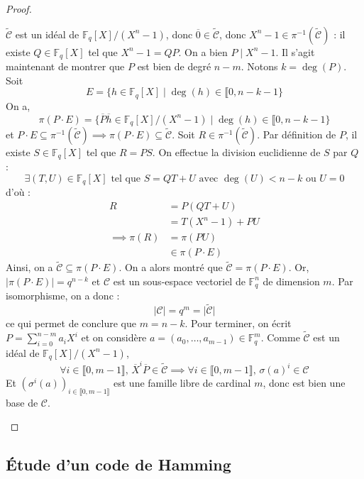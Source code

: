 \begin{proof}
\begin{enumerate}[label={\bfseries(\roman*)}]
      \newpar
      $\widetilde{\mathcal{C}}$ est un idéal de $\mathbb{F}_q[X]/(X^n-1)$, donc $\overline{0} \in \widetilde{\mathcal{C}}$, donc $X^n - 1 \in \pi^{-1}(\widetilde{\mathcal{C}})$ : il existe $Q \in \mathbb{F}_q[X]$ tel que $X^n - 1 = QP$. On a bien $P \mid X^n - 1$.
      \newpar
      Il s'agit maintenant de montrer que $P$ est bien de degré $n-m$. Notons $k = \deg(P)$. Soit
      \[ E = \{ h \in \mathbb{F}_q[X] \mid \deg(h) \in \llbracket 0, n-k-1 \} \]
      On a,
      \[ \pi(P \cdot E) = \{ \overline{P}\overline{h} \in \mathbb{F}_q[X]/(X^n-1) \mid \deg(h) \in \llbracket 0, n-k-1 \} \]
      et $P \cdot E \subseteq \pi^{-1}(\widetilde{\mathcal{C}}) \implies \pi(P\cdot E) \subseteq \widetilde{\mathcal{C}}$.
      \newpar
      Soit $R \in \pi^{-1}(\widetilde{\mathcal{C}})$. Par définition de $P$, il existe $S \in \mathbb{F}_q[X]$ tel que $R = PS$. On effectue la division euclidienne de $S$ par $Q$ :
      \[ \exists (T,U) \in \mathbb{F}_q[X] \text{ tel que } S = QT + U \text{ avec } \deg(U) < n-k \text{ ou } U = 0 \]
      d'où :
      \begin{align*}
        R &= P(QT + U) \\
        &= T(X^n - 1) + PU \\
        \implies \pi(R) &= \pi(PU) \\
        &\in \pi(P \cdot E)
      \end{align*}
      Ainsi, on a $\widetilde{\mathcal{C}} \subseteq \pi(P \cdot E)$. On a alors montré que $\widetilde{\mathcal{C}} = \pi(P \cdot E)$. Or, $\vert \pi(P \cdot E) \vert = q^{n-k}$ et $\mathcal{C}$ est un sous-espace vectoriel de $\mathbb{F}_q^n$ de dimension $m$. Par isomorphisme, on a donc :
      \[ \vert \mathcal{C} \vert = q^m = \vert \widetilde{\mathcal{C}} \vert \]
      ce qui permet de conclure que $m = n-k$.
      \newpar
      Pour terminer, on écrit $P = \sum_{i=0}^{n-m} a_i X^i$ et on considère $a = (a_0, \dots, a_{m-1}) \in \mathbb{F}_q^m$. Comme $\widetilde{\mathcal{C}}$ est un idéal de $\mathbb{F}_q[X]/(X^n-1)$,
      \[ \forall i \in \llbracket 0, m-1 \rrbracket, \, \overline{X}^i \overline{P} \in \widetilde{\mathcal{C}} \implies \forall i \in \llbracket 0, m-1 \rrbracket, \, \sigma(a)^{i} \in \mathcal{C} \]
      Et $(\sigma^{i}(a))_{i \in \llbracket 0, m-1 \rrbracket}$ est une famille libre de cardinal $m$, donc est bien une base de $\mathcal{C}$.
    \end{enumerate}
  \end{proof}

  \subsection{Étude d'un code de Hamming}

